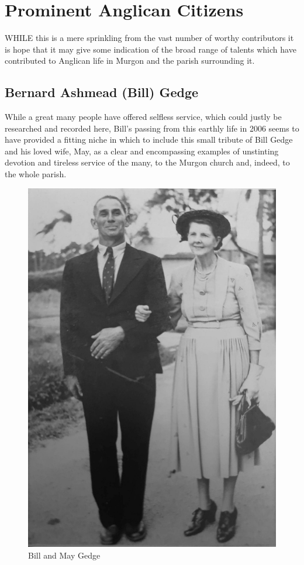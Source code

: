 \balance


\chapter{Prominent Anglican Citizens}
\nobalance


\lettrine[lines=3]{W}{HILE}
 this is a mere sprinkling from the vast number of worthy contributors it is hope that it may give some indication of the broad range of talents which have contributed to Anglican life in Murgon and the parish surrounding it.

\section{Bernard Ashmead (Bill) Gedge}



While a great many people have offered selfless service, which could justly be researched and recorded here, Bill's passing from this earthly life in 2006 seems to have provided a fitting niche in which to include this small tribute of Bill Gedge and his loved wife, May, as a clear and encompassing examples of unstinting devotion and tireless service of the many, to the Murgon church and, indeed, to the whole parish.









\begin{figure}
\begin{center}
\includegraphics[width=.7\linewidth,center]{../images/BillAndMayGedge.jpg}
\caption{Bill and May Gedge}
\end{center}
\end{figure}




